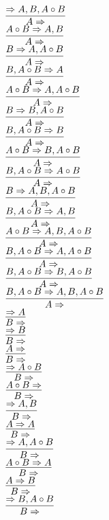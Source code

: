 \documentclass[11pt]{article}
\begin{document}
\begin{center}
\\$\infer{A\Rightarrow }{\Rightarrow A, B, A\circ B}$
\bigskip
\\$\infer{A\Rightarrow }{A\circ B\Rightarrow A, B}$
\bigskip
\\$\infer{A\Rightarrow }{B\Rightarrow A, A\circ B}$
\bigskip
\\$\infer{A\Rightarrow }{B, A\circ B\Rightarrow A}$
\bigskip
\\$\infer{A\Rightarrow }{A\circ B\Rightarrow A, A\circ B}$
\bigskip
\\$\infer{A\Rightarrow }{B\Rightarrow B, A\circ B}$
\bigskip
\\$\infer{A\Rightarrow }{B, A\circ B\Rightarrow B}$
\bigskip
\\$\infer{A\Rightarrow }{A\circ B\Rightarrow B, A\circ B}$
\bigskip
\\$\infer{A\Rightarrow }{B, A\circ B\Rightarrow A\circ B}$
\bigskip
\\$\infer{A\Rightarrow }{B\Rightarrow A, B, A\circ B}$
\bigskip
\\$\infer{A\Rightarrow }{B, A\circ B\Rightarrow A, B}$
\bigskip
\\$\infer{A\Rightarrow }{A\circ B\Rightarrow A, B, A\circ B}$
\bigskip
\\$\infer{A\Rightarrow }{B, A\circ B\Rightarrow A, A\circ B}$
\bigskip
\\$\infer{A\Rightarrow }{B, A\circ B\Rightarrow B, A\circ B}$
\bigskip
\\$\infer{A\Rightarrow }{B, A\circ B\Rightarrow A, B, A\circ B}$
\bigskip
\\$\infer{B\Rightarrow }{\Rightarrow A}$
\bigskip
\\$\infer{B\Rightarrow }{\Rightarrow B}$
\bigskip
\\$\infer{B\Rightarrow }{A\Rightarrow }$
\bigskip
\\$\infer{B\Rightarrow }{\Rightarrow A\circ B}$
\bigskip
\\$\infer{B\Rightarrow }{A\circ B\Rightarrow }$
\bigskip
\\$\infer{B\Rightarrow }{\Rightarrow A, B}$
\bigskip
\\$\infer{B\Rightarrow }{A\Rightarrow A}$
\bigskip
\\$\infer{B\Rightarrow }{\Rightarrow A, A\circ B}$
\bigskip
\\$\infer{B\Rightarrow }{A\circ B\Rightarrow A}$
\bigskip
\\$\infer{B\Rightarrow }{A\Rightarrow B}$
\bigskip
\\$\infer{B\Rightarrow }{\Rightarrow B, A\circ B}$

\end{center}
\end{document}
